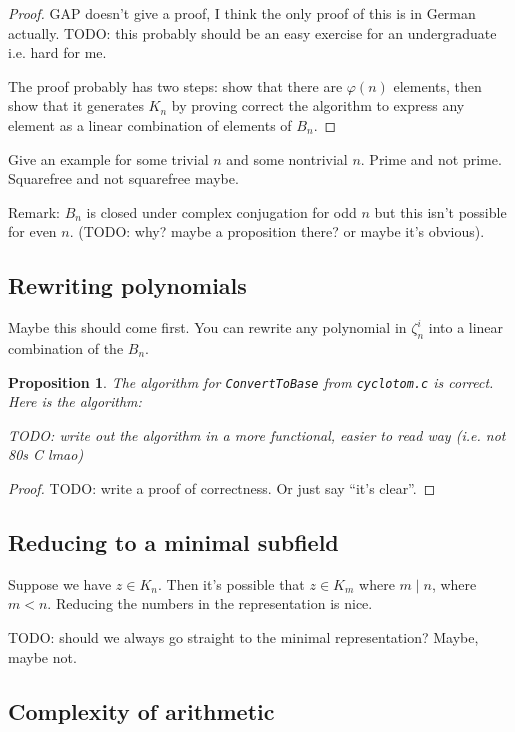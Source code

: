 \documentclass{article}
\newtheorem{prop}{Proposition}
\begin{document}
\begin{proof}
GAP doesn't give a proof, I think the only proof of this is in
German actually. TODO: this probably should be an easy exercise for an
undergraduate i.e. hard for me.

The proof probably has two steps: show that there are $\varphi(n)$
elements, then show that it generates $K_n$ by proving correct the
algorithm to express any element as a linear combination of elements
of $B_n$.
\end{proof}

Give an example for some trivial $n$ and some nontrivial $n$. Prime
and not prime. Squarefree and not squarefree maybe.

Remark: $B_n$ is closed under complex conjugation for odd $n$ but this
isn't possible for even $n$. (TODO: why? maybe a proposition there? or
maybe it's obvious).

\subsection{Rewriting polynomials}

Maybe this should come first. You can rewrite any polynomial in
$\zeta_n^i$ into a linear combination of the $B_n$.

\begin{prop}
  The algorithm for {\tt ConvertToBase} from {\tt cyclotom.c} is
  correct. Here is the algorithm:

  TODO: write out the algorithm in a more functional, easier to read
  way (i.e. not 80s C lmao)
\end{prop}

\begin{proof}
TODO: write a proof of correctness. Or just say ``it's clear''.
\end{proof}

\subsection{Reducing to a minimal subfield}

Suppose we have $z \in K_n$. Then it's possible that $z \in K_m$ where
$m \mid n$, where $m < n$. Reducing the numbers in the representation
is nice.

TODO: should we always go straight to the minimal representation?
Maybe, maybe not.

\subsection{Complexity of arithmetic}
\end{document}
